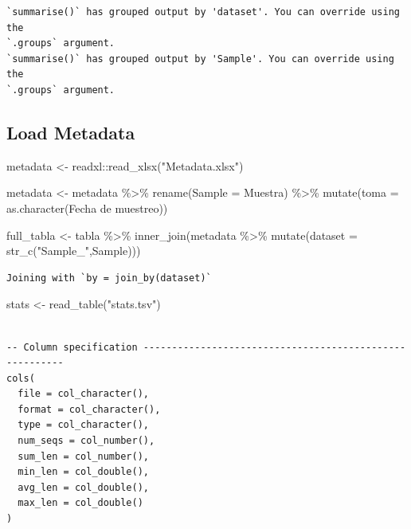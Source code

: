 \documentclass[
  letterpaper,
  DIV=11,
  numbers=noendperiod]{scrartcl}
\newenvironment{Shaded}{\begin{snugshade}}{\end{snugshade}}
\newcommand{\AttributeTok}[1]{\textcolor[rgb]{0.40,0.45,0.13}{#1}}
\newcommand{\FunctionTok}[1]{\textcolor[rgb]{0.28,0.35,0.67}{#1}}
\newcommand{\NormalTok}[1]{\textcolor[rgb]{0.00,0.23,0.31}{#1}}
\newcommand{\OtherTok}[1]{\textcolor[rgb]{0.00,0.23,0.31}{#1}}
\newcommand{\SpecialCharTok}[1]{\textcolor[rgb]{0.37,0.37,0.37}{#1}}
\newcommand{\StringTok}[1]{\textcolor[rgb]{0.13,0.47,0.30}{#1}}
\begin{document}
\begin{verbatim}
`summarise()` has grouped output by 'dataset'. You can override using the
`.groups` argument.
`summarise()` has grouped output by 'Sample'. You can override using the
`.groups` argument.
\end{verbatim}

\hypertarget{load-metadata}{%
\subsection{Load Metadata}\label{load-metadata}}

\begin{Shaded}
\begin{Highlighting}[]
\NormalTok{metadata }\OtherTok{\textless{}{-}}\NormalTok{ readxl}\SpecialCharTok{::}\FunctionTok{read\_xlsx}\NormalTok{(}\StringTok{"Metadata.xlsx"}\NormalTok{)}

\NormalTok{metadata }\OtherTok{\textless{}{-}}\NormalTok{ metadata }\SpecialCharTok{\%\textgreater{}\%} 
  \FunctionTok{rename}\NormalTok{(}\AttributeTok{Sample =}\NormalTok{ Muestra) }\SpecialCharTok{\%\textgreater{}\%} 
  \FunctionTok{mutate}\NormalTok{(}\AttributeTok{toma =} \FunctionTok{as.character}\NormalTok{(}\StringTok{\textasciigrave{}}\AttributeTok{Fecha de muestreo}\StringTok{\textasciigrave{}}\NormalTok{))}
  
  
\NormalTok{full\_tabla }\OtherTok{\textless{}{-}}\NormalTok{ tabla }\SpecialCharTok{\%\textgreater{}\%} \FunctionTok{inner\_join}\NormalTok{(metadata }\SpecialCharTok{\%\textgreater{}\%} \FunctionTok{mutate}\NormalTok{(}\AttributeTok{dataset =} \FunctionTok{str\_c}\NormalTok{(}\StringTok{"Sample\_"}\NormalTok{,Sample)))}
\end{Highlighting}
\end{Shaded}

\begin{verbatim}
Joining with `by = join_by(dataset)`
\end{verbatim}

\begin{Shaded}
\begin{Highlighting}[]
\NormalTok{stats }\OtherTok{\textless{}{-}} \FunctionTok{read\_table}\NormalTok{(}\StringTok{"stats.tsv"}\NormalTok{)}
\end{Highlighting}
\end{Shaded}

\begin{verbatim}

-- Column specification --------------------------------------------------------
cols(
  file = col_character(),
  format = col_character(),
  type = col_character(),
  num_seqs = col_number(),
  sum_len = col_number(),
  min_len = col_double(),
  avg_len = col_double(),
  max_len = col_double()
)
\end{verbatim}
\end{document}
